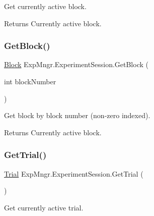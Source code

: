 Get currently active block. 

\begin{DoxyReturn}{Returns}
Currently active block.
\end{DoxyReturn}
\mbox{\label{class_exp_mngr_1_1_experiment_session_a0b9ded24b08e7b596b5ee4e9984827b5}} 
\subsubsection{\texorpdfstring{Get\+Block()}{GetBlock()}\hspace{0.1cm}{\footnotesize\ttfamily [2/2]}}
{\footnotesize\ttfamily \hyperlink{class_exp_mngr_1_1_block}{Block} Exp\+Mngr.\+Experiment\+Session.\+Get\+Block (\begin{DoxyParamCaption}\item[{int}]{block\+Number }\end{DoxyParamCaption})}



Get block by block number (non-\/zero indexed). 

\begin{DoxyReturn}{Returns}
Currently active block.
\end{DoxyReturn}
\mbox{\label{class_exp_mngr_1_1_experiment_session_af4c8f8f7fc233ae747177b8ec7e7ab68}} 
\subsubsection{\texorpdfstring{Get\+Trial()}{GetTrial()}\hspace{0.1cm}{\footnotesize\ttfamily [1/2]}}
{\footnotesize\ttfamily \hyperlink{class_exp_mngr_1_1_trial}{Trial} Exp\+Mngr.\+Experiment\+Session.\+Get\+Trial (\begin{DoxyParamCaption}{ }\end{DoxyParamCaption})}



Get currently active trial. 

